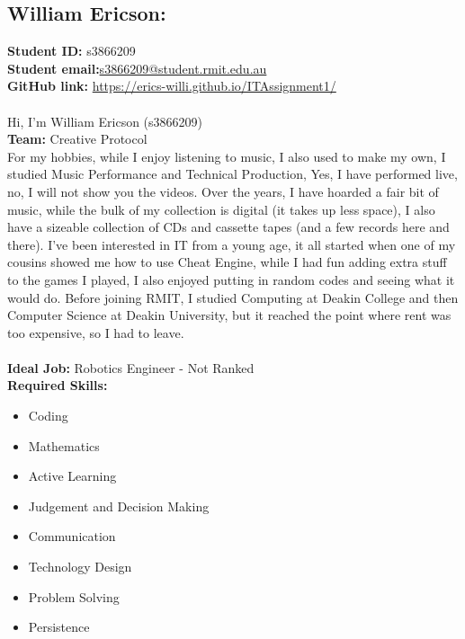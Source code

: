 \documentclass[11pt, oneside, a4paper, titlepage]{article}
\begin{document}
\subsection{William Ericson:}
\textbf{Student ID:} \hfill s3866209\\
\textbf{Student email:}\hfill \href{mailto:s3866209@student.rmit.edu.au}{s3866209@student.rmit.edu.au}\\
\textbf{GitHub link:} \hfill \href{https://erics-willi.github.io/ITAssignment1/}{https://erics-willi.github.io/ITAssignment1/}\\
\\
Hi, I'm William Ericson (s3866209) 
\\
\textbf{Team:} Creative Protocol 
\\
For my hobbies, while I enjoy listening to music, I also used to make my own, I studied Music Performance and Technical Production, Yes, I have performed live, no, I will not show you the videos. Over the years, I have hoarded a fair bit of music, while the bulk of my collection is digital (it takes up less space), I also have a sizeable collection of CDs and cassette tapes (and a few records here and there). I've been interested in IT from a young age, it all started when one of my cousins showed me how to use Cheat Engine, while I had fun adding extra stuff to the games I played, I also enjoyed putting in random codes and seeing what it would do. Before joining RMIT, I studied Computing at Deakin College and then Computer Science at Deakin University, but it reached the point where rent was too expensive, so I had to leave.
\\
\\
\textbf{Ideal Job:} \hfill Robotics Engineer - Not Ranked\\
\textbf{Required Skills:} 
\begin{itemize}
	\setlength\itemsep{0em}
	\item Coding
	\item Mathematics
	\item Active Learning
	\item Judgement and Decision Making
	\item Communication
	\item Technology Design
	\item Problem Solving
	\item Persistence
\end{itemize}
\newpage

\end{document}
